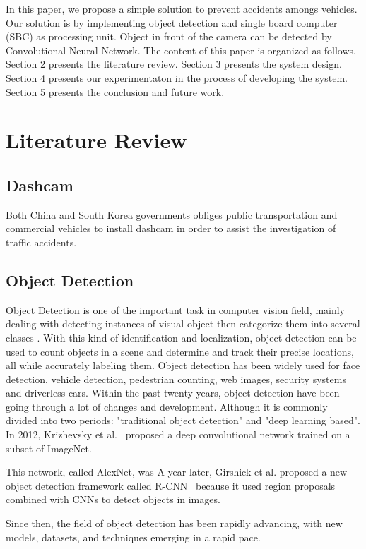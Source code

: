 \documentclass[conference]{IEEEtran}
\begin{document}
In this paper, we propose a simple solution to prevent accidents amongs vehicles. Our solution is by implementing object detection and single board computer (SBC) as processing unit. Object in front of the camera can be detected by Convolutional Neural Network. 
The content of this paper is organized as follows. Section 2 presents the literature review. Section 3 presents the system design. Section 4 presents our experimentaton in the process of developing the system. Section 5 presents the conclusion and future work.

\section{Literature Review}
\subsection{Dashcam}
Both China and South Korea governments obliges public transportation and commercial vehicles to install dashcam in order to assist the investigation of traffic accidents\cite{Korea Dashcam}.


\subsection{Object Detection}
Object Detection is one of the important task in computer vision field, mainly dealing with detecting instances of visual object then categorize them into several classes \cite{b2}.
With this kind of identification and localization, object detection can be used to count objects in a scene and determine and track their precise locations, all while accurately labeling them.
Object detection has been widely used for face detection, vehicle detection, pedestrian counting, web images, security systems and driverless cars.
Within the past twenty years, object detection have been going through a lot of changes and development. Although it is commonly divided into two periods: "traditional object detection" and "deep learning based".
In 2012, Krizhevsky et al.~\cite{b3} proposed a deep convolutional network trained on a subset of ImageNet. 

This network, called AlexNet, was 
A year later, Girshick et al. \@ proposed a new object detection framework called R-CNN~\cite{b4} because it used region proposals combined with CNNs to detect objects in images.

Since then, the field of object detection has been rapidly advancing, with new models, datasets, and techniques emerging in a rapid pace. 
\end{document}
